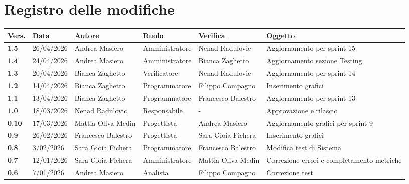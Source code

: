 \documentclass[a4paper,12pt]{article}
\begin{document}
    

    \newpage
    \section*{Registro delle modifiche}
    \begin{xltabular}{\textwidth}{|l|l|X|l|X|X|}
    \hline
    \textbf{Vers.} & \textbf{Data} & \textbf{Autore} & \textbf{Ruolo} & \textbf{Verifica} & \textbf{Oggetto} \\
    \hline
    \endhead
    \endfoot
    \hline
    \endlastfoot
                \textbf{1.5} & 26/04/2026 & Andrea Masiero & Amministratore & Nenad Radulovic & Aggiornamento per sprint 15\\
                \hline
                \textbf{1.4} & 24/04/2026 & Andrea Masiero & Amministratore & Bianca Zaghetto & Aggiornamento sezione Testing\\
                \hline
                \textbf{1.3} & 20/04/2026 & Bianca Zaghetto & Verificatore & Nenad Radulovic & Aggiornamento per sprint 14\\
                \hline
                \textbf{1.2} & 14/04/2026 & Bianca Zaghetto & Programmatore & Filippo Compagno & Inserimento grafici\\
                \hline
                \textbf{1.1} & 13/04/2026 & Bianca Zaghetto & Programmatore & Francesco Balestro & Aggiornamento per sprint 13\\
                \hline
                \textbf{1.0} & 18/03/2026 & Nenad Radulovic & Responsabile & - & Approvazione e rilascio\\
                \hline
                \textbf{0.10} & 17/03/2026 & Mattia Oliva Medin & Progettista & Andrea Masiero & Aggiornamento grafici per sprint 9\\
                \hline
                \textbf{0.9} & 26/02/2026 & Francesco Balestro & Progettista & Sara Gioia Fichera & Inserimento grafici\\
                \hline
                \textbf{0.8} & 3/02/2026 & Sara Gioia Fichera & Programmatore & Francesco Balestro & Modifica test di Sistema\\
                \hline
                \textbf{0.7} & 12/01/2026 & Sara Gioia Fichera & Amministratore & Mattia Oliva Medin & Correzione errori e completamento metriche \\
                \hline
                \textbf{0.6} & 7/01/2026 & Andrea Masiero & Analista & Filippo Compagno & Correzione test \\

\end{xltabular}
\end{document}
